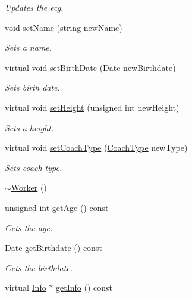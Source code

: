 \begin{DoxyCompactItemize}
\begin{DoxyCompactList}\small\item\em Updates the ecg. \end{DoxyCompactList}\item 
void \hyperlink{class_worker_a9113351bf9395094fa0e1d1cfa426881}{set\+Name} (string new\+Name)
\begin{DoxyCompactList}\small\item\em Sets a name. \end{DoxyCompactList}\item 
virtual void \hyperlink{class_worker_ac48a8315ccdeb2913cd98ea223660f72}{set\+Birth\+Date} (\hyperlink{class_date}{Date} new\+Birthdate)
\begin{DoxyCompactList}\small\item\em Sets birth date. \end{DoxyCompactList}\item 
virtual void \hyperlink{class_worker_a64124dca31baa9b110779c7698c15a57}{set\+Height} (unsigned int new\+Height)
\begin{DoxyCompactList}\small\item\em Sets a height. \end{DoxyCompactList}\item 
virtual void \hyperlink{class_worker_ae84b05468a6fdbadad9163bfc18e0569}{set\+Coach\+Type} (\hyperlink{_utils_8hpp_ad6bce769911d709b802464c1ec12e7ad}{Coach\+Type} new\+Type)
\begin{DoxyCompactList}\small\item\em Sets coach type. \end{DoxyCompactList}\item 
\hyperlink{class_worker_aa8e4543ef1e93fd9d884269ba30c5bfe}{$\sim$\+Worker} ()
\item 
unsigned int \hyperlink{class_worker_ae82fdc34f91e5f47dc709d97329a872f}{get\+Age} () const
\begin{DoxyCompactList}\small\item\em Gets the age. \end{DoxyCompactList}\item 
\hyperlink{class_date}{Date} \hyperlink{class_worker_a43fb49c315c8c0a656924e8da285ddf9}{get\+Birthdate} () const
\begin{DoxyCompactList}\small\item\em Gets the birthdate. \end{DoxyCompactList}\item 
virtual \hyperlink{class_info}{Info} $\ast$ \hyperlink{class_worker_a95a4f7c750644937859b8e14515a480e}{get\+Info} () const

\end{DoxyCompactItemize}
